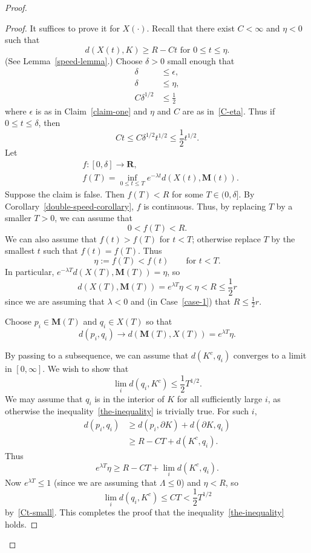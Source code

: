 \documentclass{amsart}
\newcommand{\MMM}{\mathbf M}
\newcommand{\RR}{\mathbf{R}}  %
\newcommand{\eps}{\epsilon}
\theoremstyle{definition}
\theoremstyle{definition}
\begin{document}
\begin{proof}
\begin{proof}
It suffices to prove it for $X(\cdot)$.
Recall that there exist $C<\infty$ and $\eta<0$ such that
\begin{equation}\label{C-eta}
    \text{$d(X(t), K) \ge R - Ct$ for $0\le t\le \eta$.}
\end{equation}
(See Lemma~\ref{speed-lemma}.)
Choose $\delta>0$ small enough that
\begin{align*}
\delta&\le \eps, \\
\delta&\le \eta, \\
C\delta^{1/2} &\le \frac12
\end{align*}
where $\eps$ is as in Claim~\ref{claim-one} and $\eta$ and $C$ are as in~\eqref{C-eta}.
Thus if $0\le t \le \delta$, then
\begin{equation}\label{Ct-small}
  Ct \le C \delta^{1/2} t^{1/2}  \le  \frac12 t^{1/2}.
\end{equation}
Let 
\begin{align*}
&f: [0,\delta] \to \RR, \\
&f(T) = \inf_{0\le t\le T} e^{-\lambda t} d(X(t),\MMM(t)).
\end{align*}
Suppose the claim is false.  Then $f(T)<R$ for some $T\in (0,\delta]$.
 By Corollary~\ref{double-speed-corollary}, $f$
is continuous.
Thus, by replacing $T$ by a smaller $T>0$, we can
assume that 
\[
   0 < f(T) < R.
\]
We can also assume that $f(t)>f(T)$ for $t<T$; otherwise replace $T$
by the smallest $t$ such that $f(t)=f(T)$.
Thus
\[
   \eta:=f(T) < f(t) \qquad\text{for $t<T$}.
\]
In particular, $e^{-\lambda T} d(X(T),\MMM(T)) =\eta$,
so
\begin{equation}\label{close-enough}
d(X(T),\MMM(T)) = e^{\lambda T}\eta < \eta < R \le \frac12r
\end{equation}
since we are assuming that $\lambda<0$ and (in Case~\ref{case-1}) that $R\le \frac12r$.




Choose $p_i\in \MMM(T)$ and $q_i\in X(T)$ so that
\[
   d(p_i,q_i) \to d(\MMM(T),X(T)) = e^{\lambda T}\eta.
\]

By passing to a subsequence, we can assume that $d(K^c,q_i)$ converges to a limit in $[0,\infty]$.
We wish to show that
\begin{equation}\label{the-inequality}
  \lim_i d(q_i, K^c) \le \frac12 T^{1/2}.
\end{equation}
We may assume that $q_i$ is in the interior of $K$ for all sufficiently large $i$, as otherwise
the inequality~\eqref{the-inequality} is trivially true. 
For such $i$,
\begin{align*}
d(p_i,q_i)
&\ge 
d(p_i, \partial K) + d(\partial K,q_i) \\
&\ge
R- CT + d(K^c,q_i).
\end{align*}
Thus
\[
e^{\lambda T}\eta \ge R - CT + \lim_i d(K^c,q_i).
\]
Now $e^{\lambda T} \le 1$ (since we are assuming that $\Lambda\le 0$)
 and $\eta<R$, so
\[
   \lim_i d(q_i,K^c) \le CT < \frac12 T^{1/2}
\]
by~\eqref{Ct-small}.
This completes the proof that the inequality~\eqref{the-inequality} holds.


\end{proof}
\end{proof}
\end{document}
